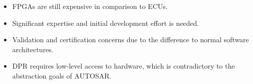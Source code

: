 \begin{itemize}
\item \glspl{FPGA} are still expensive in comparison to \glspl{ECU}.
\item Significant expertise and initial development effort is needed.
\item Validation and certification concerns due to the difference to normal software architectures.
\item \gls{DPR} requires low-level access to hardware, which is contradictory to the abstraction goals of \gls{AUTOSAR}.
\end{itemize}